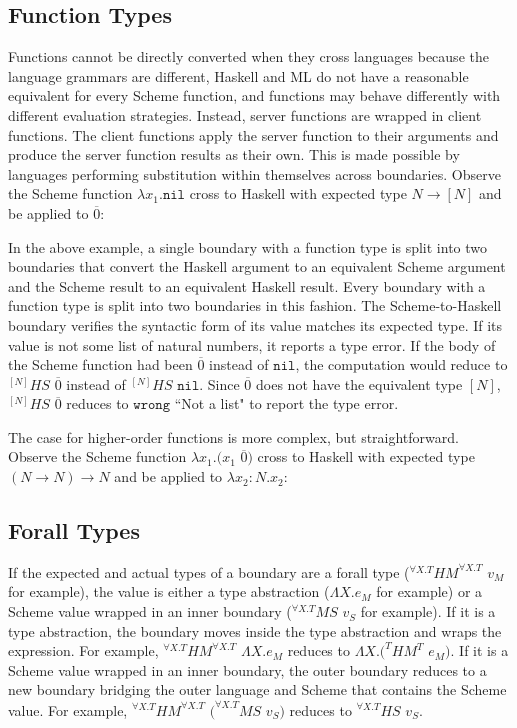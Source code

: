 \subsection{Function Types}

Functions cannot be directly converted when they cross languages because the language grammars are different, Haskell and ML do not have a reasonable equivalent for every Scheme function, and functions may behave differently with different evaluation strategies.  Instead, server functions are wrapped in client functions.  The client functions apply the server function to their arguments and produce the server function results as their own.  This is made possible by languages performing substitution within themselves across boundaries.  Observe the Scheme function $\lambda x_{1}.\mathtt{nil}$ cross to Haskell with expected type $N\rightarrow[N]$ and be applied to $\overline{0}$:



In the above example, a single boundary with a function type is split into two boundaries that convert the Haskell argument to an equivalent Scheme argument and the Scheme result to an equivalent Haskell result.  Every boundary with a function type is split into two boundaries in this fashion.  The Scheme-to-Haskell boundary verifies the syntactic form of its value matches its expected type.  If its value is not some list of natural numbers, it reports a type error.  If the body of the Scheme function had been $\overline{0}$ instead of $\mathtt{nil}$, the computation would reduce to $^{[N]}HS$ $\overline{0}$ instead of $^{[N]}HS$ $\mathtt{nil}$.  Since $\overline{0}$ does not have the equivalent type $[N]$, $^{[N]}HS$ $\overline{0}$ reduces to $\mathtt{wrong}$ ``Not a list" to report the type error.

The case for higher-order functions is more complex, but straightforward.  Observe the Scheme function $\lambda x_{1}.(x_{1}$ $\overline{0})$ cross to Haskell with expected type $(N\rightarrow N)\rightarrow N$ and be applied to $\lambda x_{2}:N.x_{2}$:



\subsection{Forall Types}

If the expected and actual types of a boundary are a forall type ($^{\forall X.T}HM^{\forall X.T}$ $v_{M}$ for example), the value is either a type abstraction ($\Lambda X.e_{M}$ for example) or a Scheme value wrapped in an inner boundary ($^{\forall X.T}MS$ $v_{S}$ for example).  If it is a type abstraction, the boundary moves inside the type abstraction and wraps the expression.  For example, $^{\forall X.T}HM^{\forall X.T}$ $\Lambda X.e_{M}$ reduces to $\Lambda X.(^{T}HM^{T}$ $e_{M})$.  If it is a Scheme value wrapped in an inner boundary, the outer boundary reduces to a new boundary bridging the outer language and Scheme that contains the Scheme value.  For example, $^{\forall X.T}HM^{\forall X.T}$ $(^{\forall X.T}MS$ $v_{S})$ reduces to $^{\forall X.T}HS$ $v_{S}$.


